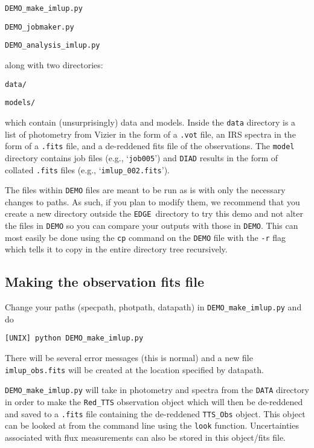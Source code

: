 \documentclass{article}
\newcommand{\edge}{\texttt{EDGE }}
\begin{document}
\vspace{2mm}
\texttt{DEMO\_make\_imlup.py}

\texttt{DEMO\_jobmaker.py}

\texttt{DEMO\_analysis\_imlup.py}
\vspace{2mm}

\noindent along with two directories:

\vspace{2mm}
\texttt{data/}

\texttt{models/}
\vspace{2mm}

\noindent which contain (unsurprisingly) data and models. Inside the \texttt{data} directory is a list of photometry from Vizier in the form of a \texttt{.vot} file,  an IRS spectra in the form of a \texttt{.fits} file, and a de-reddened fits file of the observations. The \texttt{model} directory contains job files (e.g., `\texttt{job005}') and \texttt{DIAD} results in the form of collated \texttt{.fits} files (e.g., `\texttt{imlup\_002.fits}').

\noindent The files within \texttt{DEMO} files are meant to be run as is with only the necessary changes to paths. As such, if you plan to modify them, we recommend that you create a new directory outside the \edge directory to try this demo and not alter the files in \texttt{DEMO} so you can compare your outputs with those in \texttt{DEMO}.  This can most easily be done using the \texttt{cp} command on the \texttt{DEMO} file with the \texttt{-r} flag which tells it to copy in the entire directory tree recursively. 

\subsection{Making the observation fits file}

Change your paths (specpath, photpath, datapath) in \texttt{DEMO\_make\_imlup.py} and do

\vspace{2mm}
\texttt{[UNIX] python DEMO\_make\_imlup.py}
\vspace{2mm}

\noindent There will be several error messages (this is normal) and a new file \texttt{imlup\_obs.fits} will be created at the location specified by datapath.
\vspace{2mm}

\noindent \texttt{DEMO\_make\_imlup.py} will take in photometry and spectra from the \texttt{DATA} directory in order to make the \texttt{Red\_TTS} observation object which will then be de-reddened and saved to a \texttt{.fits} file containing the de-reddened \texttt{TTS\_Obs} object. This object can be looked at from the command line using the \texttt{look} function. Uncertainties associated with flux measurements can also be stored in this object/fits file.
\end{document}
